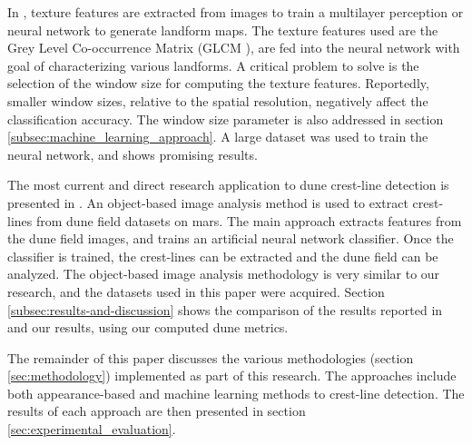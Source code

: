 In \cite{2011_neural_network_based_dunal_landform_mapping}, texture features are extracted from images to train a multilayer perception or neural network to generate landform maps. The texture features used are the Grey Level Co-occurrence Matrix (GLCM \cite{1973_textural_features_image_classification}), are fed into the neural network with goal of characterizing various landforms. A critical problem to solve is the selection of the window size for computing the texture features. Reportedly, smaller window sizes, relative to the spatial resolution, negatively affect the classification accuracy. The window size parameter is also addressed in section \ref{subsec:machine_learning_approach}. A large dataset was used to train the neural network, and shows promising results.

The most current and direct research application to dune crest-line detection is presented in \cite{vaz_object_based_dune_analysis}. An object-based image analysis method is used to extract crest-lines from dune field datasets on mars. The main approach extracts features from the dune field images, and trains an artificial neural network classifier. Once the classifier is trained, the crest-lines can be extracted and the dune field can be analyzed. The object-based image analysis methodology is very similar to our research, and the datasets used in this paper were acquired. Section \ref{subsec:results-and-discussion} shows the comparison of the results reported in \cite{vaz_object_based_dune_analysis} and our results, using our computed dune metrics.

The remainder of this paper discusses the various methodologies (section \ref{sec:methodology}) implemented as part of this research. The approaches include both appearance-based and machine learning methods to crest-line detection. The results of each approach are then presented in section \ref{sec:experimental_evaluation}.

